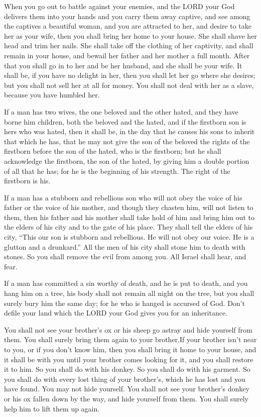 \myverse{}When you go out to battle against your enemies, and the LORD
your God delivers them into your hands and you carry them away captive,
\myverse{}and see among the captives a beautiful woman, and you are attracted to her,
and desire to take her as your wife,
\myverse{}then you shall bring her home to your house. She shall shave her head and
trim her nails.
\myverse{}She shall take off the clothing of her captivity, and shall remain in your
house, and bewail her father and her mother a full month. After that you shall go in to her and be her
husband, and she shall be your wife.
\myverse{}It shall be, if you have no delight in her, then you shall let her go where
she desires; but you shall not sell her at all for money. You shall not deal with her as a slave, because
you have humbled her.


\myverse{}If a man has two wives, the one beloved and the other hated,
and they have borne him children, both the beloved and the hated, and if the firstborn son is hers who
was hated,
\myverse{}then it shall be, in the day that he causes his sons to inherit that which
he has, that he may not give the son of the beloved the rights of the firstborn before the son of the
hated, who is the firstborn;
\myverse{}but he shall acknowledge the firstborn, the son of the hated, by giving him
a double portion of all that he has; for he is the beginning of his strength. The right of the firstborn
is his.


\myverse{}If a man has a stubborn and rebellious son who will not obey
the voice of his father or the voice of his mother, and though they chasten him, will not listen to them,
\myverse{}then his father and his mother shall take hold of him and bring him out to
the elders of his city and to the gate of his place.
\myverse{}They shall tell the elders of his city, “This our son is stubborn and rebellious.
He will not obey our voice. He is a glutton and a drunkard.”
\myverse{}All the men of his city shall stone him to death with stones. So you shall
remove the evil from among you. All Israel shall hear, and fear.


\myverse{}If a man has committed a sin worthy of death, and he is put
to death, and you hang him on a tree,
\myverse{}his body shall not remain all night on the tree, but you shall surely bury
him the same day; for he who is hanged is accursed of God. Don’t defile your land which the LORD your
God gives you for an inheritance.


\mychapter{} \myverse*{}You shall not see your brother’s ox or his sheep go astray and
hide yourself from them. You shall surely bring them again to your brother.\myverse{}If your brother isn’t near to you, or if you don’t know him, then you shall
bring it home to your house, and it shall be with you until your brother comes looking for it, and you
shall restore it to him.
\myverse{}So you shall do with his donkey. So you shall do with his garment. So you shall
do with every lost thing of your brother’s, which he has lost and you have found. You may not hide yourself.
\myverse{}You shall not see your brother’s donkey or his ox fallen down by the way, and
hide yourself from them. You shall surely help him to lift them up again.

